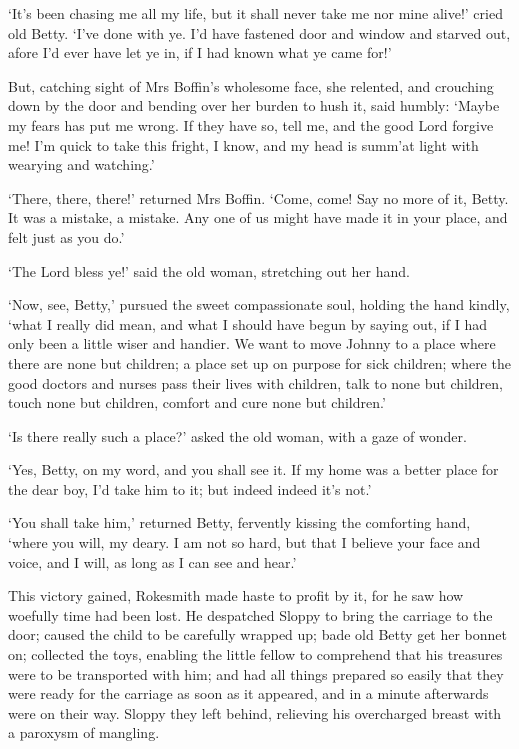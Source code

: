 ‘It’s been chasing me all my life, but it shall never take me nor mine
alive!’ cried old Betty. ‘I’ve done with ye. I’d have fastened door and
window and starved out, afore I’d ever have let ye in, if I had known
what ye came for!’

But, catching sight of Mrs Boffin’s wholesome face, she relented, and
crouching down by the door and bending over her burden to hush it, said
humbly: ‘Maybe my fears has put me wrong. If they have so, tell me, and
the good Lord forgive me! I’m quick to take this fright, I know, and my
head is summ’at light with wearying and watching.’

‘There, there, there!’ returned Mrs Boffin. ‘Come, come! Say no more of
it, Betty. It was a mistake, a mistake. Any one of us might have made it
in your place, and felt just as you do.’

‘The Lord bless ye!’ said the old woman, stretching out her hand.

‘Now, see, Betty,’ pursued the sweet compassionate soul, holding the
hand kindly, ‘what I really did mean, and what I should have begun by
saying out, if I had only been a little wiser and handier. We want to
move Johnny to a place where there are none but children; a place set
up on purpose for sick children; where the good doctors and nurses pass
their lives with children, talk to none but children, touch none but
children, comfort and cure none but children.’

‘Is there really such a place?’ asked the old woman, with a gaze of
wonder.

‘Yes, Betty, on my word, and you shall see it. If my home was a better
place for the dear boy, I’d take him to it; but indeed indeed it’s not.’

‘You shall take him,’ returned Betty, fervently kissing the comforting
hand, ‘where you will, my deary. I am not so hard, but that I believe
your face and voice, and I will, as long as I can see and hear.’

This victory gained, Rokesmith made haste to profit by it, for he saw
how woefully time had been lost. He despatched Sloppy to bring the
carriage to the door; caused the child to be carefully wrapped up; bade
old Betty get her bonnet on; collected the toys, enabling the little
fellow to comprehend that his treasures were to be transported with
him; and had all things prepared so easily that they were ready for
the carriage as soon as it appeared, and in a minute afterwards were
on their way. Sloppy they left behind, relieving his overcharged breast
with a paroxysm of mangling.

